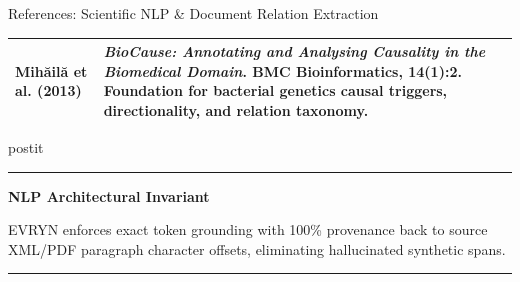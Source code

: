 \documentclass[aspectratio=43,10pt]{beamer}
\newcommand{\card}[4][\linewidth]{%
  \begin{beamercolorbox}[wd=#1,sep=0pt,rounded=false,shadow=false]{postit}%
    {\color{#3}\rule{\linewidth}{1.5pt}}\par
    \colorbox{slatebg}{%
      \begin{minipage}{\dimexpr#1-8pt\relax}%
        \vspace{1.5pt}%
        {\footnotesize\bfseries\color{#3}#2}\vspace{1.5pt}\par%
        {\scriptsize\color{darktext}#4}%
        \vspace{1.5pt}%
      \end{minipage}%
    }%
    \par{\color{bordergray}\rule{\linewidth}{0.6pt}}%
  \end{beamercolorbox}%
}
\begin{document}
\begin{frame}{References: Scientific NLP \& Document Relation Extraction}
\begin{center}
\begin{tabularx}{\linewidth}{p{2.2cm}>{\raggedright\arraybackslash}X}
      \addlinespace[1.5pt]
      \textbf{Mih\u{a}il\u{a} et al. (2013)} & \textit{BioCause: Annotating and Analysing Causality in the Biomedical Domain}. BMC Bioinformatics, 14(1):2. Foundation for bacterial genetics causal triggers, directionality, and relation taxonomy. \\
      \bottomrule
    \end{tabularx}
  \end{center}
  \vspace{0.04cm}
  \card{NLP Architectural Invariant}{teal}{
    \fontsize{5.2pt}{6.4pt}\selectfont EVRYN enforces exact token grounding with 100\% provenance back to source XML/PDF paragraph character offsets, eliminating hallucinated synthetic spans.
  }
\end{frame}

\end{document}
